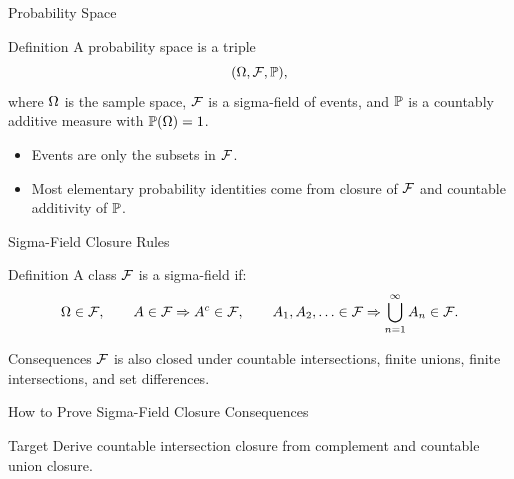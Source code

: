 \begin{frame}{Probability Space}
  \begin{block}{Definition}
    A probability space is a triple
    \[
      (\Omega,\mathcal{F},\mathbb{P}),
    \]
    where $\Omega$ is the sample space, $\mathcal{F}$ is a sigma-field of events, and $\mathbb{P}$ is a countably additive measure with $\mathbb{P}(\Omega)=1$.
  \end{block}
  \begin{itemize}
    \item Events are only the subsets in $\mathcal{F}$.
    \item Most elementary probability identities come from closure of $\mathcal{F}$ and countable additivity of $\mathbb{P}$.
  \end{itemize}
\end{frame}

\begin{frame}{Sigma-Field Closure Rules}
  \begin{block}{Definition}
    A class $\mathcal{F}$ is a sigma-field if:
    \[
      \Omega\in\mathcal{F},\qquad A\in\mathcal{F}\Rightarrow A^c\in\mathcal{F},\qquad
      A_1,A_2,\ldots\in\mathcal{F}\Rightarrow \bigcup_{n=1}^{\infty}A_n\in\mathcal{F}.
    \]
  \end{block}
  \begin{block}{Consequences}
    $\mathcal{F}$ is also closed under countable intersections, finite unions, finite intersections, and set differences.
  \end{block}
\end{frame}

\begin{frame}[shrink=8]{How to Prove Sigma-Field Closure Consequences}
  \begin{block}{Target}
    Derive countable intersection closure from complement and countable union closure.
  \end{block}
\end{frame}

